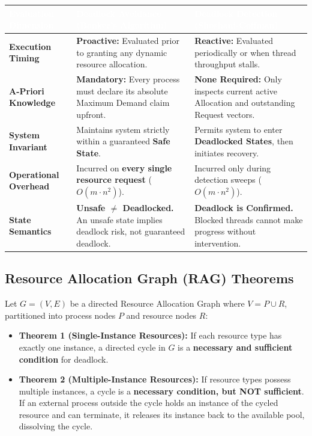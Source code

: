 \documentclass[11pt,a4paper]{article}
\begin{document}
\begin{table}[h!]
\centering
\small
\renewcommand{\arraystretch}{1.25}
\begin{tabularx}{\textwidth}{|L{3.2cm}|L{6.2cm}|X|}
\hline
{}
\textcolor{white}{\textbf{Evaluation Dimension}} & \textcolor{white}{\textbf{Deadlock Avoidance (Banker's Algorithm)}} & \textcolor{white}{\textbf{Deadlock Detection (Shoshani-Coffman)}} \\
\hline
\textbf{Execution Timing} & \textbf{Proactive:} Evaluated prior to granting any dynamic resource allocation. & \textbf{Reactive:} Evaluated periodically or when thread throughput stalls. \\
\hline
\textbf{A-Priori Knowledge} & \textbf{Mandatory:} Every process must declare its absolute Maximum Demand claim upfront. & \textbf{None Required:} Only inspects current active Allocation and outstanding Request vectors. \\
\hline
\textbf{System Invariant} & Maintains system strictly within a guaranteed \textbf{Safe State}. & Permits system to enter \textbf{Deadlocked States}, then initiates recovery. \\
\hline
\textbf{Operational Overhead} & Incurred on \textbf{every single resource request} ($O(m \cdot n^2)$). & Incurred only during detection sweeps ($O(m \cdot n^2)$). \\
\hline
\textbf{State Semantics} & \textbf{Unsafe $\ne$ Deadlocked.} An unsafe state implies deadlock risk, not guaranteed deadlock. & \textbf{Deadlock is Confirmed.} Blocked threads cannot make progress without intervention. \\
\hline
\end{tabularx}
\end{table}

\subsection{Resource Allocation Graph (RAG) Theorems}
Let $G = (V, E)$ be a directed Resource Allocation Graph where $V = P \cup R$, partitioned into process nodes $P$ and resource nodes $R$:
\begin{itemize}[leftmargin=1.5em,noitemsep]
    \item \textbf{Theorem 1 (Single-Instance Resources):} If each resource type has exactly one instance, a directed cycle in $G$ is a \textbf{necessary and sufficient condition} for deadlock.
    \item \textbf{Theorem 2 (Multiple-Instance Resources):} If resource types possess multiple instances, a cycle is a \textbf{necessary condition, but NOT sufficient}. If an external process outside the cycle holds an instance of the cycled resource and can terminate, it releases its instance back to the available pool, dissolving the cycle.
\end{itemize}
\end{document}
